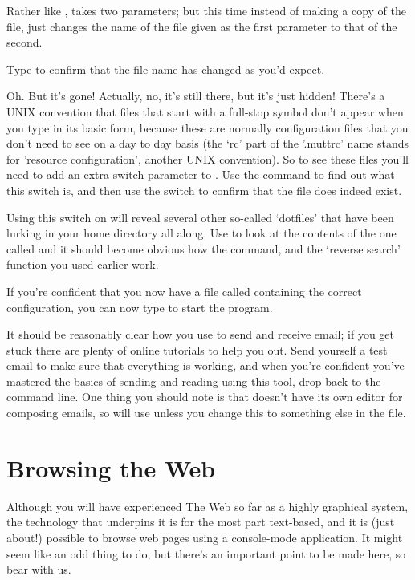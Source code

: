 Rather like ,  takes two parameters; but this time instead of making a copy of the file,  just changes the name of the file given as the first parameter to that of the second. 

Type  to confirm that the file name has changed as you'd expect. 

Oh. But it's gone! Actually, no, it's still there, but it's just hidden! There's a UNIX convention that files that start with a full-stop symbol don't appear when you type  in its basic form, because these are normally configuration files that you don't need to see on a day to day basis (the `rc' part of the '.muttrc' name stands for 'resource configuration', another UNIX convention). So to see these files you'll need to add an extra switch parameter to . Use the  command to find out what this switch is, and then use the switch to confirm that the  file does indeed exist. 

Using this switch on  will reveal several other so-called `dotfiles' that have been lurking in your home directory all along. Use  to look at the contents of the one called  and it should become obvious how the  command, and the `reverse search' function you used earlier work.

If you're confident that you now have a file called  containing the correct configuration, you can now type  to start the program. 

It should be reasonably clear how you use  to send and receive email; if you get stuck there are plenty of online tutorials to help you out. Send yourself a test email to make sure that everything is working, and when you're confident you've mastered the basics of sending and reading using this tool, drop back to the command line. One thing you should note is that  doesn't have its own editor for composing emails, so will use  unless you change this to something else in the  file. 

\section{Browsing the Web}

Although you will have experienced The Web so far as a highly graphical system, the technology that underpins it is for the most part text-based, and it is (just about!) possible to browse web pages using a console-mode application. It might seem like an odd thing to do, but there's an important point to be made here, so bear with us.


